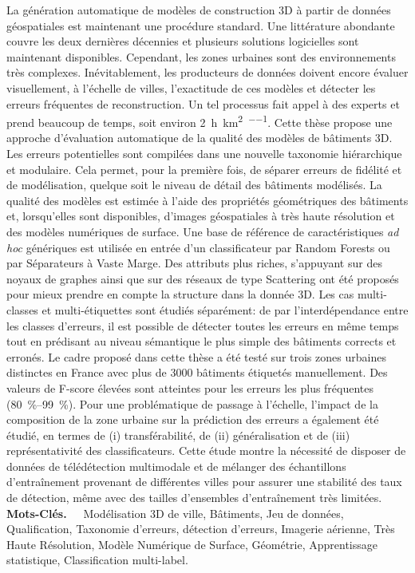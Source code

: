 La génération automatique de modèles de construction 3D à partir de données géospatiales est maintenant une procédure standard.
Une littérature abondante couvre les deux dernières décennies et plusieurs solutions logicielles sont maintenant disponibles.
Cependant, les zones urbaines sont des environnements très complexes.
Inévitablement, les producteurs de données doivent encore évaluer visuellement, à l'échelle de villes, l'exactitude de ces modèles et détecter les erreurs fréquentes de reconstruction.
Un tel processus fait appel à des experts et prend beaucoup de temps, soit environ \SI[per-mode=repeated-symbol, locale=FR]{2}{\hour\per\km\squared\per\expert}.
Cette thèse propose une approche d'évaluation automatique de la qualité des modèles de bâtiments 3D.
Les erreurs potentielles sont compilées dans une nouvelle taxonomie hiérarchique et modulaire.
Cela permet, pour la première fois, de séparer erreurs de fidélité et de modélisation, quelque soit le niveau de détail des bâtiments modélisés.
La qualité des modèles est estimée à l'aide des propriétés géométriques des bâtiments et, lorsqu'elles sont disponibles, d'images géospatiales à très haute résolution et des modèles numériques de surface.
Une base de référence de caractéristiques \textit{ad hoc} génériques est utilisée en entrée d'un classificateur par Random Forests ou par Séparateurs à Vaste Marge.
Des attributs plus riches, s'appuyant sur des noyaux de graphes ainsi que sur des réseaux de type Scattering ont été proposés pour mieux prendre en compte la structure dans la donnée 3D.
Les cas multi-classes et multi-étiquettes sont étudiés séparément: de par l'interdépendance entre les classes d'erreurs, il est possible de détecter toutes les erreurs en même temps tout en prédisant au niveau sémantique le plus simple des bâtiments corrects et erronés.
Le cadre proposé dans cette thèse a été testé sur trois zones urbaines distinctes en France avec plus de \num[locale=FR]{3000} bâtiments étiquetés manuellement.
Des valeurs de F-score élevées sont atteintes pour les erreurs les plus fréquentes (\SIrange[range-phrase={ -- }, locale=FR]{80}{99}{\percent}).
Pour une problématique de passage à l’échelle, l'impact de la composition de la zone urbaine sur la prédiction des erreurs a également été étudié, en termes de (i) transférabilité, de (ii) généralisation et de (iii) représentativité des classificateurs.
Cette étude montre la nécessité de disposer de données de télédétection multimodale et de mélanger des échantillons d'entraînement provenant de différentes villes pour assurer une stabilité des taux de détection, même avec des tailles d'ensembles d'entraînement très limitées.\\

\textbf{Mots-Clés.}~\ ~Modélisation 3D de ville, Bâtiments, Jeu de données, Qualification, Taxonomie d'erreurs, détection d'erreurs, Imagerie aérienne, Très Haute Résolution, Modèle Numérique de Surface, Géométrie, Apprentissage statistique, Classification multi-label.
